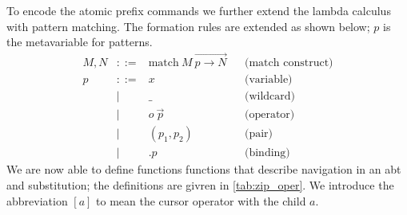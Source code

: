 \documentclass[sigplan,anonymous,review]{acmart}
\begin{document}
To encode the atomic prefix commands we further extend the lambda
calculus with pattern matching. The formation rules are extended as
shown below; $p$ is the metavariable for patterns.
\begin{align*}
    M, N & ::= & \text{match}\ M\ \overrightarrow{p \to N} && \text{(match construct)}
    \\
    p & ::= & x              & & \text{(variable)} \\
      & |   & \_             && \text{(wildcard)} \\
      & |   & o\ \Vec{p}     && \text{(operator)} \\
      & |   & (p_1, p_2)     && \text{(pair)} \\
         & |   & .p             && \text{(binding)}
\end{align*}
%
We are now able to define functions functions that describe navigation
in an abt and substitution; the definitions are givren in
\cref{tab:zip_oper}. We introduce the abbreviation $[a]$ to mean the
cursor operator with the child $a$.

\end{document}
